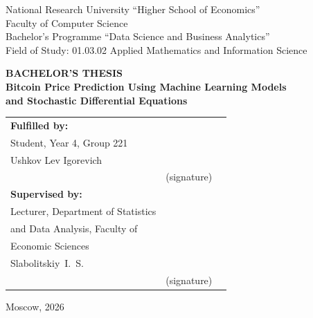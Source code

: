 \documentclass[12pt, a4paper, oneside]{report}
\theoremstyle{plain}
\theoremstyle{definition}
\theoremstyle{remark}
\begin{document}
\begin{titlepage}
\thispagestyle{empty}
\begin{center}
\begin{singlespace}
{\normalsize
National Research University ``Higher School of Economics''
}\\[4pt]
{\normalsize Faculty of Computer Science}\\[30pt]

{\normalsize Bachelor's Programme ``Data Science and Business Analytics''}\\[4pt]
{\normalsize Field of Study: 01.03.02 Applied Mathematics and Information Science}
\end{singlespace}

\vfill

{\Large \textbf{BACHELOR'S THESIS}}\\[16pt]

{\large \textbf{Bitcoin Price Prediction Using Machine Learning Models\\
and Stochastic Differential Equations}}

\vfill

\begin{flushleft}
\begin{singlespace}
\begin{tabular}{@{}p{}p{}p{}@{}}
\textbf{Fulfilled by:} & & \\[6pt]
Student, Year 4, Group 221 & & \\
Ushkov Lev Igorevich & \underline{\hspace{3cm}} & \\
& \small(signature) & \\[20pt]
\textbf{Supervised by:} & & \\[6pt]
Lecturer, Department of Statistics & & \\
and Data Analysis, Faculty of & & \\
Economic Sciences & & \\
Slabolitskiy~I.~S. & \underline{\hspace{3cm}} & \\
& \small(signature) & \\
\end{tabular}
\end{singlespace}
\end{flushleft}

\vfill

{\normalsize Moscow, 2026}
\end{center}
\end{titlepage}
\end{document}
